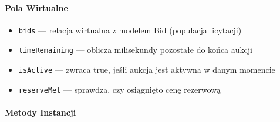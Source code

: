 \paragraph{Pola Wirtualne}

\begin{itemize}
  \item \texttt{bids} --- relacja wirtualna z modelem Bid (populacja licytacji)
  \item \texttt{timeRemaining} --- oblicza milisekundy pozostałe do końca aukcji
  \item \texttt{isActive} --- zwraca true, jeśli aukcja jest aktywna w danym momencie
  \item \texttt{reserveMet} --- sprawdza, czy osiągnięto cenę rezerwową
\end{itemize}

\paragraph{Metody Instancji}
